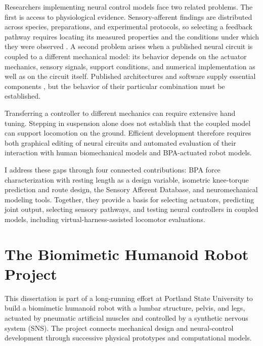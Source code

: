 Researchers implementing neural control models face two related problems. The first is access to physiological evidence. Sensory-afferent findings are distributed across species, preparations, and experimental protocols, so selecting a feedback pathway requires locating its measured properties and the conditions under which they were observed \citep{van_de_crommert_review_1998, windhorst_muscle_2007, windhorst_spinal_2022}. A second problem arises when a published neural circuit is coupled to a different mechanical model: its behavior depends on the actuator mechanics, sensory signals, support conditions, and numerical implementation as well as on the circuit itself. Published architectures and software supply essential components \citep{rybak_modelling_2006, mccrea_organization_2008, markin_afferent_2010, nourse_sns_2023}, but the behavior of their particular combination must be established.

Transferring a controller to different mechanics can require extensive hand tuning. Stepping in suspension alone does not establish that the coupled model can support locomotion on the ground. Efficient development therefore requires both graphical editing of neural circuits and automated evaluation of their interaction with human biomechanical models and BPA-actuated robot models.

I address these gaps through four connected contributions: BPA force characterization with resting length as a design variable, isometric knee-torque prediction and route design, the Sensory Afferent Database, and neuromechanical modeling tools. Together, they provide a basis for selecting actuators, predicting joint output, selecting sensory pathways, and testing neural controllers in coupled models, including virtual-harness-assisted locomotor evaluations.

\section{The Biomimetic Humanoid Robot Project}\label{sec:project}

This dissertation is part of a long-running effort at Portland State University to build a biomimetic humanoid robot with a lumbar structure, pelvis, and legs, actuated by pneumatic artificial muscles and controlled by a synthetic nervous system (SNS). The project connects mechanical design and neural-control development through successive physical prototypes and computational models.

